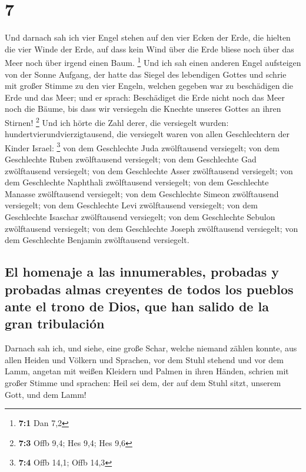 \hypertarget{section-6}{%
\section{7}\label{section-6}}

 Und darnach sah ich vier Engel stehen auf den vier Ecken
der Erde, die hielten die vier Winde der Erde, auf dass kein Wind über
die Erde bliese noch über das Meer noch über irgend einen Baum.
\footnote{\textbf{7:1} Dan 7,2}  Und ich sah einen anderen
Engel aufsteigen von der Sonne Aufgang, der hatte das Siegel des
lebendigen Gottes und schrie mit großer Stimme zu den vier Engeln,
welchen gegeben war zu beschädigen die Erde und das Meer; 
und er sprach: Beschädiget die Erde nicht noch das Meer noch die Bäume,
bis dass wir versiegeln die Knechte unseres Gottes an ihren Stirnen!
\footnote{\textbf{7:3} Offb 9,4; Hes 9,4; Hes 9,6}  Und
ich hörte die Zahl derer, die versiegelt wurden:
hundertvierundvierzigtausend, die versiegelt waren von allen
Geschlechtern der Kinder Israel: \footnote{\textbf{7:4} Offb 14,1; Offb
  14,3}  von dem Geschlechte Juda zwölftausend versiegelt;
von dem Geschlechte Ruben zwölftausend versiegelt; von dem Geschlechte
Gad zwölftausend versiegelt;  von dem Geschlechte Asser
zwölftausend versiegelt; von dem Geschlechte Naphthali zwölftausend
versiegelt; von dem Geschlechte Manasse zwölftausend versiegelt;
 von dem Geschlechte Simeon zwölftausend versiegelt; von
dem Geschlechte Levi zwölftausend versiegelt; von dem Geschlechte
Isaschar zwölftausend versiegelt;  von dem Geschlechte
Sebulon zwölftausend versiegelt; von dem Geschlechte Joseph zwölftausend
versiegelt; von dem Geschlechte Benjamin zwölftausend versiegelt.

\hypertarget{el-homenaje-a-las-innumerables-probadas-y-probadas-almas-creyentes-de-todos-los-pueblos-ante-el-trono-de-dios-que-han-salido-de-la-gran-tribulaciuxf3n}{%
\subsection{El homenaje a las innumerables, probadas y probadas almas
creyentes de todos los pueblos ante el trono de Dios, que han salido de
la gran
tribulación}\label{el-homenaje-a-las-innumerables-probadas-y-probadas-almas-creyentes-de-todos-los-pueblos-ante-el-trono-de-dios-que-han-salido-de-la-gran-tribulaciuxf3n}}

 Darnach sah ich, und siehe, eine große Schar, welche
niemand zählen konnte, aus allen Heiden und Völkern und Sprachen, vor
dem Stuhl stehend und vor dem Lamm, angetan mit weißen Kleidern und
Palmen in ihren Händen,  schrien mit großer Stimme und
sprachen: Heil sei dem, der auf dem Stuhl sitzt, unserem Gott, und dem
Lamm!

